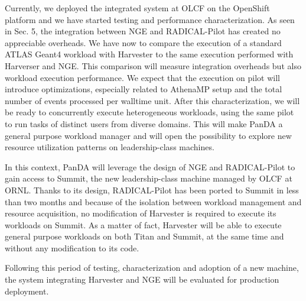 \documentclass{webofc}
\begin{document}
Currently, we deployed the integrated system at OLCF on the OpenShift
platform and we have started testing and performance characterization. As
seen in Sec. 5, the integration between NGE and RADICAL-Pilot has created no
appreciable overheads. We have now to compare the execution of a standard
ATLAS Geant4 workload with Harvester to the same execution performed with
Harverser and NGE. This comparison will measure integration overheads but
also workload execution performance. We expect that the execution on pilot
will introduce optimizations, especially related to AthenaMP setup and the
total number of events processed per walltime unit. After this
characterization, we will be ready to concurrently execute heterogeneous
workloads, using the same pilot to run tasks of distinct users from diverse
domains. This will make PanDA a general purpose workload manager and will
open the possibility to explore new resource utilization patterns on
leadership-class machines.

In this context, PanDA will leverage the design of NGE and RADICAL-Pilot to
gain access to Summit, the new leadership-class machine managed by OLCF at
ORNL. Thanks to its design, RADICAL-Pilot has been ported to Summit in less
than two months and because of the isolation between workload management and
resource acquisition, no modification of Harvester is required to execute its
workloads on Summit. As a matter of fact, Harvester will be able to execute
general purpose workloads on both Titan and Summit, at the same time and
without any modification to its code.

Following this period of testing, characterization and adoption of a new
machine, the system integrating Harvester and NGE will be evaluated for
production deployment.



\end{document}
